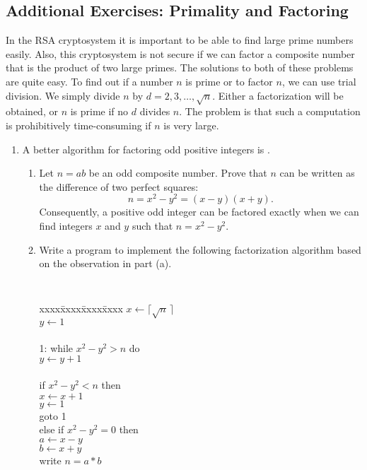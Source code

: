 
\subsection*{Additional Exercises: Primality and Factoring}
 
{\small 
 
 
In the RSA cryptosystem it is important to be able to find
large prime numbers easily.  Also, this cryptosystem is not secure if we
can factor a composite number that is the product of two large primes.
The solutions to both of these problems are quite easy.  To
find out if a number $n$ is prime or to factor $n$, we can use trial
division. We simply divide $n$ by $d = 2, 3, \ldots, \sqrt{n}$.
Either a factorization will be obtained, or $n$ is prime if no $d$
divides $n$.  The problem is that such a computation is prohibitively
time-consuming if $n$ is very large. 
\begin{enumerate}
 
 
\item
A better algorithm for factoring odd positive integers is . 
\begin{enumerate}
 
\item
Let $n= ab$ be an odd composite number. Prove that $n$ can be written
as the difference of two perfect squares:
\[
n = x^2 - y^2 = (x-y)(x+y).
\]
Consequently, a positive odd integer can be factored exactly when we
can find integers $x$ and $y$ such that $n = x^2 - y^2$.
 
\item
Write a program to implement the following factorization algorithm
based on the observation in part (a).
 
\medskip
 
{\tt
\begin{tabbing}
xxxx\=xxxx\=xxxx\=xxxx \kill
\> $x \leftarrow \lceil \sqrt{n}\, \rceil$ \\
\> $y \leftarrow 1$ \\
\mbox{\hspace*{1in}} \\
1: \> while $x^2 - y^2 > n$ do \\
\> \> $y \leftarrow y + 1$ \\
\mbox{\hspace*{1in}} \\
\> if $x^2 - y^2 < n$ then \\
\> \>  $x \leftarrow x + 1$ \\
\> \>  $y \leftarrow 1$ \\
\> \>  goto 1 \\
\> else if $x^2 - y^2 = 0$ then \\
\>  \> $a \leftarrow x-y$ \\
\>  \> $b \leftarrow x+y$ \\
\>  \> write $n = a * b$ 
\end{tabbing}
 
}
\end{enumerate}
\end{enumerate}}
